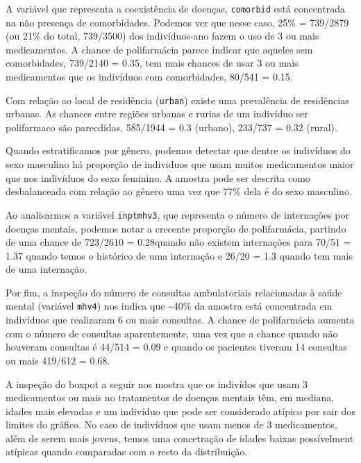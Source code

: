 \documentclass[
  11pt,
]{article}
\begin{document}
A variável que representa a coexistência de doenças, \texttt{comorbid} está concentrada na não presença de comorbidades. Podemos ver que nesse caso, 25\% = 739/2879 (ou 21\% do total, 739/3500) dos indivíduos-ano fazem o uso de 3 ou mais medicamentos. A chance de polifarmácia parece indicar que aqueles sem comorbidades, 739/2140 = 0.35, tem mais chances de usar 3 ou mais medicamentos que os indivíduos com comorbidades, 80/541 = 0.15.

Com relação ao local de residência (\texttt{urban}) existe uma prevalência de residências urbanas. As chances entre regiões urbanas e rurias de um indivíduo ser polifarmaco são parecdidas, 585/1944 = 0.3 (urbano), 233/737 = 0.32 (rural).

Quando estratificamos por gênero, podemos detectar que dentre os indivíduos do sexo masculino há proporção de individuos que usam muitos medicamentos maior que nos indivíduos do sexo feminino. A amostra pode ser descrita como desbalanceada com relação ao gênero uma vez que 77\% dela é do sexo masculino.

Ao analisarmos a variável \texttt{inptmhv3}, que representa o número de internações por doenças mentais, podemos notar a crecente proporção de polifarmácia, partindo de uma chance de 723/2610 = 0.28quando não existem internações para 70/51 = 1.37 quando temos o histórico de uma internação e 26/20 = 1.3 quando tem mais de uma internação.

Por fim, a inspeção do número de consultas ambulatoriais relacionadas à saúde mental (variável \texttt{mhv4}) nos indica que \textasciitilde40\% da amostra está concentrada em indivíduos que realizaram 6 ou mais consultas. A chance de polifarmácia aumenta com o número de consultas aparentemente, uma vez que a chance quando não houveram consultas é 44/514 = 0.09 e quando os pacientes tiveram 14 consultas ou mais 419/612 = 0.68.

A inspeção do boxpot a seguir nos mostra que os indivídos que usam 3 medicamentos ou mais no tratamentos de doenças mentais têm, em mediana, idades mais elevadas e um indivíduo que pode ser considerado atípico por sair dos limites do gráfico. No caso de indivíduos que usam menos de 3 medicamentos, além de serem mais jovens, temos uma concetração de idades baixas possívelment atípicas quando comparadas com o resto da distribuição.
\end{document}
